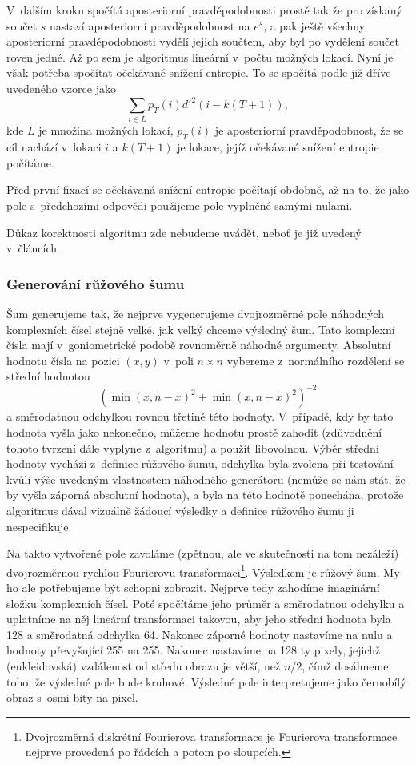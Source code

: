V~dalším kroku spočítá aposteriorní pravděpodobnosti prostě tak že pro získaný
součet $s$ nastaví aposteriorní pravděpodobnost na $e^s$, a pak ještě všechny
aposteriorní pravděpodobnosti vydělí jejich součtem, aby byl po vydělení součet
roven jedné. Až po sem je algoritmus lineární v~počtu možných lokací. Nyní je
však potřeba spočítat očekávané snížení entropie. To se spočítá podle již dříve
uvedeného vzorce jako $$\displaystyle\sum_{i\in L} p_T(i)d'^2(i-k(T+1)),$$ kde
$L$ je množina možných lokací, $p_T(i)$ je aposteriorní pravděpodobnost, že se
cíl nachází v~lokaci $i$ a $k(T+1)$ je lokace, jejíž očekávané snížení entropie
počítáme.   

Před první fixací se očekávaná snížení entropie počítají obdobně, až na to, že
jako pole s~předchozími odpovědi použijeme pole vyplněné samými nulami.

Důkaz korektnosti algoritmu zde nebudeme uvádět, neboť je již uvedený v~článcích \citep{Najemnik05, Najemnik08, Najemnik09}.

\subsubsection*{Generování růžového šumu}


Šum generujeme tak, že nejprve vygenerujeme dvojrozměrné pole náhodných
komplexních čísel stejně velké, jak velký chceme výsledný šum. Tato komplexní
čísla mají v~goniometrické podobě rovnoměrně náhodné argumenty. Absolutní
hodnotu čísla na pozici $(x,y)$ v~poli $n\times n$ vybereme z~normálního
rozdělení se střední hodnotou \begin{equation}\label{Pink}\left(\min\left(x,n-x\right)^2
+\min\left(x,n-x\right)^2\right)^{-2}\end{equation} a směrodatnou odchylkou rovnou třetině
této hodnoty. V~případě, kdy by tato hodnota vyšla jako nekonečno, můžeme
hodnotu prostě zahodit (zdůvodnění tohoto tvrzení dále vyplyne z~algoritmu) a
použít libovolnou. Výběr střední hodnoty vychází z~definice růžového šumu,
odchylka byla zvolena při testování kvůli výše uvedeným vlastnostem náhodného
generátoru (nemůže se nám stát, že by vyšla záporná absolutní hodnota), a byla
na této hodnotě ponechána, protože algoritmus dával vizuálně žádoucí výsledky a
definice růžového šumu ji nespecifikuje.

Na takto vytvořené pole zavoláme (zpětnou, ale ve skutečnosti na tom nezáleží)
dvojrozměrnou rychlou Fourierovu transformaci\footnote{Dvojrozměrná diskrétní
Fourierova transformace je Fourierova transformace nejprve provedená po řádcích
a potom po sloupcích.}.  Výsledkem je růžový šum. My ho ale potřebujeme být
schopni zobrazit. Nejprve tedy zahodíme imaginární složku komplexních čísel.
Poté spočítáme jeho průměr a směrodatnou odchylku a uplatníme na něj lineární
transformaci takovou, aby jeho střední hodnota byla 128 a směrodatná odchylka
64. Nakonec záporné hodnoty nastavíme na nulu a hodnoty převyšující 255 na 255.
Nakonec nastavíme na 128 ty pixely, jejichž (eukleidovská) vzdálenost od středu
obrazu je větší, než $n/2$, čímž dosáhneme toho, že výsledné pole bude kruhové.
Výsledné pole interpretujeme jako černobílý obraz s~osmi bity na pixel.


